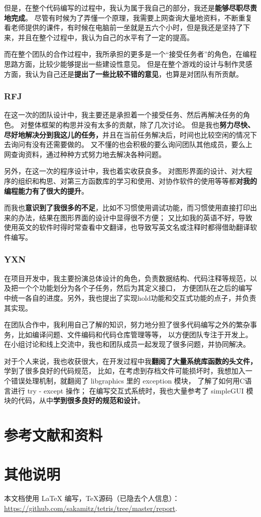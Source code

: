 \documentclass{style/ucasproposal}
\begin{document}
但是，在整个代码编写的过程中，我认为属于我自己的部分，我还是\textbf{能够尽职尽责地完成}。
尽管有时候为了弄懂一个原理，我需要上网查询大量地资料，不断重复看老师提供的课件，有时候在电脑前一坐就是五六个小时，但是我还是坚持了下来，并且在整个过程中，我认为自己的水平有了一定的提高。

而在整个团队的合作过程中，我所承担的更多是一个“接受任务者”的角色，在编程思路方面，比较少能够提出一些建设性意见。
但是在整个游戏的设计与制作灵感方面，我认为自己还是\textbf{提出了一些比较不错的意见}，也算是对团队有所贡献。

\subsubsection{RFJ}
在这一次的团队设计中，我主要还是承担着一个接受任务、然后再解决任务的角色。
对整体框架的构思并没有太多的贡献，除了几次讨论。
但是我也\textbf{努力尽快、尽好地解决分到我这儿的任务，}并且在当前任务解决后，时间也比较空闲的情况下去询问有没有还需要做的。
又不懂的也会积极的要么询问团队其他成员，要么上网查询资料，通过种种方式努力地去解决各种问题。

另外，在这一次的程序设计中，我也着实收获良多。
对图形界面的设计、对大程序的组织和构思、对第三方函数库的学习和使用、对协作软件的使用等等都\textbf{对我的编程能力有了很大的提升}。

而我也\textbf{意识到了我很多的不足}，比如不习惯使用调试功能，而习惯使用直接打印出来的办法，结果在图形界面的设计中显得很不方便；
又比如我的英语不好，导致使用英文的软件时得时常查看中文翻译，也导致写英文名或注释时都得借助翻译软件编写。

\subsubsection{YXN}
在项目开发中，我主要扮演总体设计的角色，负责数据结构、代码注释等规范，以及把一个个功能划分为各个子任务，然后为其定义接口，
方便团队在之后的编写中统一各自的进度。另外，我也提出了实现hold功能和交互式功能的点子，并负责其实现。

在团队合作中，我利用自己了解的知识，努力地分担了很多代码编写之外的繁杂事务，比如编译问题、文件编码和代码仓库管理等等，
以方便团队专注于开发上。在小组讨论和线上交流中，我也和团队成员一起发现了很多问题，并协同解决。

对于个人来说，我也收获很大，在开发过程中我\textbf{翻阅了大量系统库函数的头文件，}学到了很多良好的代码规范，
比如，在考虑到存档文件可能损坏时，我想加入一个错误处理机制，就翻阅了 libgraphics 里的 exception 模块，
了解了如何用C语言进行 try - except 操作；
在编写交互式系统时，我也大量参考了 simpleGUI 模块的代码，从中\textbf{学到很多良好的规范和设计}。


\section{参考文献和资料}


\section*{其他说明}

本文档使用 \LaTeX{} 编写，TeX源码（已隐去个人信息）： \url{https://github.com/sakamitz/tetris/tree/master/report}.
\end{document}
